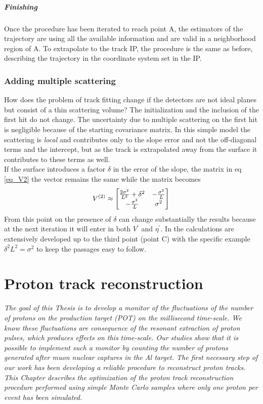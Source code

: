 \documentclass[12pt,a4paper,openright, oneside, titlepage]{book} %
\begin{document}
\paragraph{Finishing} Once the procedure has been iterated  to reach point A, 
the estimators of the trajectory are using all the available information and are valid in a neighborhood region of A. 
To extrapolate to the track IP, 
the procedure is the same as before, 
describing the trajectory in the coordinate system set in the IP. 

\subsection*{Adding multiple scattering}
How does the problem of track fitting change if the detectors are not ideal planes but consist of a thin scattering volume? 
The initialization and the inclusion of the first hit do not change. 
The uncertainty due to multiple scattering on the first hit is negligible because of the starting covariance matrix. 
In this simple model the scattering is \textit{local} and contributes only to the slope error and not the off-diagonal terms 
and the intercept, but as the track is extrapolated away from the surface it contributes to these terms as well.\\
If the surface introduces a factor $\delta$ in the error of the slope, 
the matrix in eq \ref{eq_V2} the vector remains the same while the matrix becomes
$$
V^{(2)}\approx
\begin{bmatrix}
\frac{2\sigma^2}{L^2}+\delta^2 & -\frac{\sigma^2}{L} \\
-\frac{\sigma^2}{L} & \sigma^2
\end{bmatrix}\\
$$
From this point on the presence of $\delta$ can change substantially the results because at the next iteration it will enter in both $V^\prime$ and $\eta^\prime$.
 In \cite{KutschkePaper} the calculations are extensively developed up to the third point (point C) 
 with the specific example $\delta^2L^2=\sigma^2$ to keep the passages easy to follow.

\chapter{Proton track reconstruction}
{\itshape 
The goal of this Thesis is to develop a monitor of the fluctuations of the number of protons on the production target (POT) on the millisecond time-scale. 
We know these fluctuations are consequence of the resonant extraction of proton pulses, which produces effects on this time-scale. 
Our studies show that it is possible to implement such a monitor by counting the number of protons generated after muon nuclear captures in the Al target. 
The first necessary step of our work has been developing a reliable procedure to reconstruct proton tracks.  
This Chapter describes the optimization of the proton track reconstruction procedure performed using simple Monte Carlo samples where only one proton per event has been simulated.}
\end{document}
